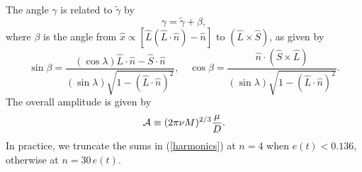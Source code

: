 \documentclass{iopart}
\def\be{\begin{equation}}
\def\ee{\end{equation}}
\begin{document}
The angle $\gamma$ is related to $\tilde \gamma$ by
\be
\label{beta}
\gamma = \tilde\gamma + \beta,
\ee
where $\beta$ is the angle from $\hat x \propto [\hat L(\hat L \cdot \hat n) - \hat n] $ to $(\hat L \times \hat S)$, as given by
\begin{equation}\label{sinbeta}
\sin\beta = \frac{(\cos\lambda) \hat L\cdot\hat n -\hat S\cdot \hat n }
{(\sin\lambda)\sqrt{1 - (\hat L\cdot\hat n)^2}}, \quad
\cos\beta = \frac{\hat n \cdot (\hat S \times \hat L)}
{(\sin\lambda)\sqrt{1 - (\hat L\cdot\hat n)^2} }.
\end{equation}
%
The overall amplitude is given by
\begin{equation} \label{calA}
{\cal A}\equiv (2\pi \nu M)^{2/3}\frac{\mu}{D}.
\end{equation}
In practice, we truncate the sums in (\ref{harmonics}) at $n=4$ when $e(t) < 0.136$, otherwise at $n = 30 \, e(t)$.
\end{document}
